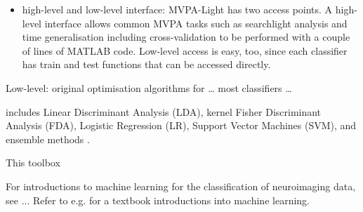 \documentclass[utf8]{frontiersSCNS} %
\begin{document}
\begin{itemize}
\item high-level and low-level interface: MVPA-Light has two access points. A high-level interface allows common MVPA tasks such as searchlight analysis and time generalisation including cross-validation to be performed with a couple of lines of MATLAB code. Low-level access is easy, too, since each classifier has train and test functions that can be accessed directly. 
\end{itemize}


Low-level: original optimisation algorithms for … most classifiers …

includes Linear Discriminant Analysis (LDA), kernel Fisher Discriminant Analysis (FDA), Logistic Regression (LR), Support Vector Machines (SVM), and ensemble methods \cite{Hastie2009}.

This toolbox



For introductions to machine learning for the classification of neuroimaging data, see \cite{Blankertz2011,Lemm2011,Mur2009,Grootswagers2017DecodingData,King2014} ... Refer to e.g. \cite{Hastie2009,Bishop2007} for a textbook introductions into machine learning.


\end{document}
